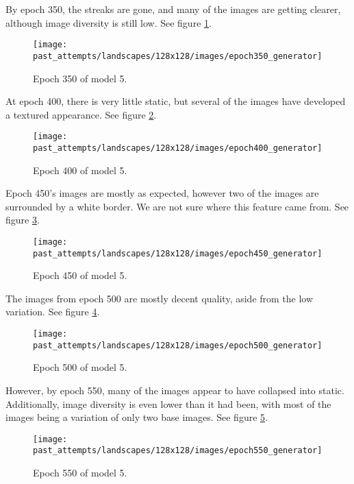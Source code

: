 \documentclass[11pt,letterpaper]{article}
\begin{document}
				By epoch 350, the streaks are gone, and many of the images are getting clearer, although image diversity is still low.
				See figure \ref{fig:wa128:epoch350generator}.
				\begin{figure}
					\centering
					\texttt{[image: past\_attempts/landscapes/128x128/images/epoch350\_generator]}
					\caption{Epoch 350 of model 5.}
					\label{fig:wa128:epoch350generator}
				\end{figure}

				At epoch 400, there is very little static, but several of the images have developed a textured appearance.
				See figure \ref{fig:wa128:epoch400generator}.
				\begin{figure}
					\centering
					\texttt{[image: past\_attempts/landscapes/128x128/images/epoch400\_generator]}
					\caption{Epoch 400 of model 5.}
					\label{fig:wa128:epoch400generator}
				\end{figure}

				Epoch 450's images are mostly as expected, however two of the images are surrounded by a white border.
				We are not sure where this feature came from.
				See figure \ref{fig:wa128:epoch450generator}.
				\begin{figure}
					\centering
					\texttt{[image: past\_attempts/landscapes/128x128/images/epoch450\_generator]}
					\caption{Epoch 450 of model 5.}
					\label{fig:wa128:epoch450generator}
				\end{figure}

				The images from epoch 500 are mostly decent quality, aside from the low variation.
				See figure \ref{fig:wa128:epoch500generator}.
				\begin{figure}
					\centering
					\texttt{[image: past\_attempts/landscapes/128x128/images/epoch500\_generator]}
					\caption{Epoch 500 of model 5.}
					\label{fig:wa128:epoch500generator}
				\end{figure}

				However, by epoch 550, many of the images appear to have collapsed into static.
				Additionally, image diversity is even lower than it had been, with most of the images being a variation of only two base images.
				See figure \ref{fig:wa128:epoch550generator}.
				\begin{figure}
					\centering
					\texttt{[image: past\_attempts/landscapes/128x128/images/epoch550\_generator]}
					\caption{Epoch 550 of model 5.}
					\label{fig:wa128:epoch550generator}
				\end{figure}
\end{document}
